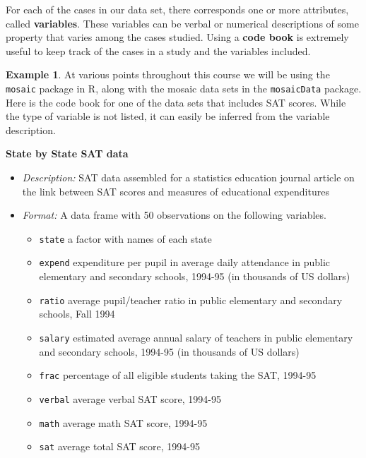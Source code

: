 \documentclass[
]{book}
\providecommand{\tightlist}{%
  \setlength{\itemsep}{0pt}\setlength{\parskip}{0pt}}
\theoremstyle{definition}
\theoremstyle{definition}
\newtheorem{example}{Example}[chapter]
\theoremstyle{definition}
\theoremstyle{definition}
\theoremstyle{remark}
\begin{document}
For each of the cases in our data set, there corresponds one or more attributes, called \textbf{variables}. These variables can be verbal or numerical descriptions of some property that varies among the cases studied. Using a \textbf{code book} is extremely useful to keep track of the cases in a study and the variables included.

\begin{example}

At various points throughout this course we will be using the \texttt{mosaic} package in R, along with the mosaic data sets in the \texttt{mosaicData} package. Here is the code book for one of the data sets that includes SAT scores. While the type of variable is not listed, it can easily be inferred from the variable description.

\textbf{State by State SAT data}

\begin{itemize}
\item
  \emph{Description:} SAT data assembled for a statistics education journal article on the link between SAT scores and measures of educational expenditures
\item
  \emph{Format:} A data frame with 50 observations on the following variables.

  \begin{itemize}
  \tightlist
  \item
    \texttt{state} a factor with names of each state
  \item
    \texttt{expend} expenditure per pupil in average daily attendance in public elementary and secondary schools, 1994-95 (in thousands of US dollars)
  \item
    \texttt{ratio} average pupil/teacher ratio in public elementary and secondary schools, Fall 1994
  \item
    \texttt{salary} estimated average annual salary of teachers in public elementary and secondary schools, 1994-95 (in thousands of US dollars)
  \item
    \texttt{frac} percentage of all eligible students taking the SAT, 1994-95
  \item
    \texttt{verbal} average verbal SAT score, 1994-95
  \item
    \texttt{math} average math SAT score, 1994-95
  \item
    \texttt{sat} average total SAT score, 1994-95
  \end{itemize}
\end{itemize}

\end{example}
\end{document}
